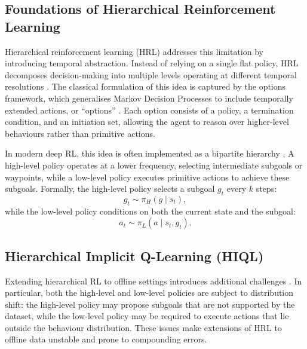 \subsection{Foundations of Hierarchical Reinforcement Learning}

Hierarchical reinforcement learning (HRL) addresses this limitation by introducing temporal abstraction. Instead of relying on a single flat policy, HRL decomposes decision-making into multiple levels operating at different temporal resolutions \cite{BartoMahadevan2003, SUTTON1999181}. The classical formulation of this idea is captured by the options framework, which generalises Markov Decision Processes to include temporally extended actions, or ``options'' \cite{SUTTON1999181}. Each option consists of a policy, a termination condition, and an initiation set, allowing the agent to reason over higher-level behaviours rather than primitive actions.

In modern deep RL, this idea is often implemented as a bipartite hierarchy \cite{vezhnevets2017feudalnetworkshierarchicalreinforcement, nachum2018dataefficienthierarchicalreinforcementlearning, levy2019learningmultilevelhierarchieshindsight}. A high-level policy operates at a lower frequency, selecting intermediate subgoals or waypoints, while a low-level policy executes primitive actions to achieve these subgoals. Formally, the high-level policy selects a subgoal $g_t$ every $k$ steps:
\begin{equation}
    g_t \sim \pi_H(g \mid s_t),
\end{equation}
while the low-level policy conditions on both the current state and the subgoal:
\begin{equation}
    a_t \sim \pi_L(a \mid s_t, g_t).
\end{equation}

\subsection{Hierarchical Implicit Q-Learning (HIQL)}

Extending hierarchical RL to offline settings introduces additional challenges \cite{park2024hiqlofflinegoalconditionedrl}. In particular, both the high-level and low-level policies are subject to distribution shift: the high-level policy may propose subgoals that are not supported by the dataset, while the low-level policy may be required to execute actions that lie outside the behaviour distribution. These issues make extensions of HRL to offline data unstable and prone to compounding errors.

